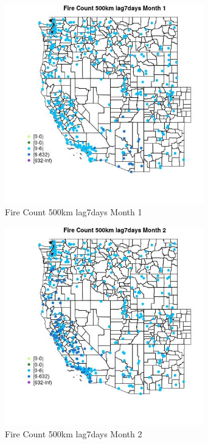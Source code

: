 \begin{figure} 
\centering  
\includegraphics[width=0.77\textwidth]{Code_Outputs/Report_ML_input_PM25_Step4_part_e_de_duplicated_aves_compiled_2019-05-18wNAs_MapObsMo1Fire_Count_500km_lag7days.jpg} 
\caption{\label{fig:Report_ML_input_PM25_Step4_part_e_de_duplicated_aves_compiled_2019-05-18wNAsMapObsMo1Fire_Count_500km_lag7days}Fire Count 500km lag7days Month 1} 
\end{figure} 
 

\begin{figure} 
\centering  
\includegraphics[width=0.77\textwidth]{Code_Outputs/Report_ML_input_PM25_Step4_part_e_de_duplicated_aves_compiled_2019-05-18wNAs_MapObsMo2Fire_Count_500km_lag7days.jpg} 
\caption{\label{fig:Report_ML_input_PM25_Step4_part_e_de_duplicated_aves_compiled_2019-05-18wNAsMapObsMo2Fire_Count_500km_lag7days}Fire Count 500km lag7days Month 2} 
\end{figure} 
 

